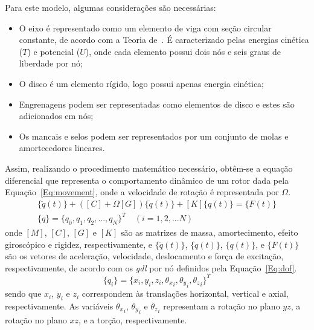 Para este modelo, algumas considerações são necessárias:
\begin{itemize}
	\item O eixo é representado como um elemento de viga com seção circular constante, de acordo com a Teoria de~. É caracterizado pelas energias cinética ($T$) e potencial ($U$), onde cada elemento possui dois nós e seis graus de liberdade por nó;
	\item O disco é um elemento rígido, logo possui apenas energia cinética;
	\item Engrenagens podem ser representadas como elementos de disco e estes são adicionados em nós;
	\item Os mancais e selos podem ser representados por um conjunto de molas e amortecedores lineares.
\end{itemize}

Assim, realizando o procedimento matemático necessário, obtêm-se a equação diferencial que representa o comportamento dinâmico de um rotor dada pela Equação~\ref{Eq:movement}, onde a velocidade de rotação é representada por $\Omega$.
\begin{gather}
	[M]\{\ddot{q}(t)\}+([C]+\Omega [G])\{\dot{q}(t)\}+[K]\{q(t)\}=\{F(t)\} \label{Eq:movement} \\
	\{q\} = \{q_0, q_1, q_2, ..., q_N\}^{T} \quad (i = 1, 2, ... N) \label{Eq:dof}
\end{gather}
onde $[M]$, $[C]$, $[G]$ e $[K]$ são as matrizes de massa, amortecimento, efeito giroscópico e rigidez, respectivamente, e $\{\ddot{q}(t)\}$, $\{\dot{q}(t)\}$, $\{q(t)\}$, e $\{F(t)\}$ são os vetores de aceleração, velocidade, deslocamento e força de excitação, respectivamente, de acordo com os \textit{gdl} por nó definidos pela Equação~\ref{Eq:dof}.
\begin{equation}
	\{q_i\} = \{x_i,y_i,z_i, {\theta_x}_i, {\theta_y}_i, {\theta_z}_i\}^{T}
	\label{Eq:dof}
\end{equation}
sendo que $x_i$, $y_i$ e $z_i$ correspondem às translações horizontal, vertical e axial, respectivamente. As variáveis ${\theta_x}_i$, ${\theta_y}_i$ e ${\theta_z}_i$ representam a rotação no plano $yz$, a rotação no plano $xz$, e a torção, respectivamente.

